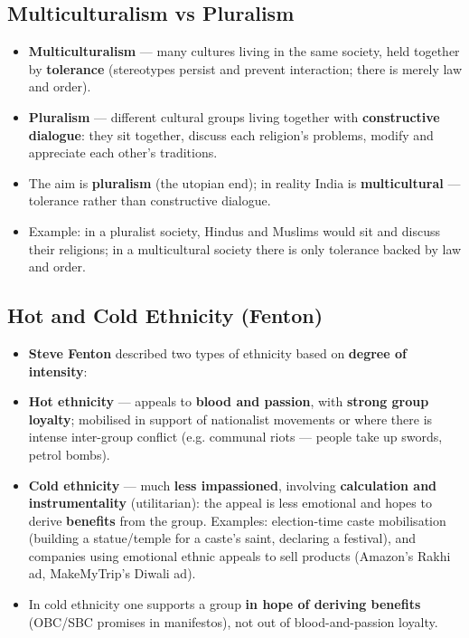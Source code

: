 \subsection{Multiculturalism vs Pluralism}

\begin{ComparisonBox}
\begin{itemize}
\item \textbf{Multiculturalism} --- many cultures living in the same society, held together by \textbf{tolerance} (stereotypes persist and prevent interaction; there is merely law and order).
\item \textbf{Pluralism} --- different cultural groups living together with \textbf{constructive dialogue}: they sit together, discuss each religion's problems, modify and appreciate each other's traditions.
\item The aim is \textbf{pluralism} (the utopian end); in reality India is \textbf{multicultural} --- tolerance rather than constructive dialogue.
\item Example: in a pluralist society, Hindus and Muslims would sit and discuss their religions; in a multicultural society there is only tolerance backed by law and order.
\end{itemize}
\end{ComparisonBox}

\subsection{Hot and Cold Ethnicity (Fenton)}

\begin{KeyConcept}
\begin{itemize}
\item \textbf{Steve Fenton} described two types of ethnicity based on \textbf{degree of intensity}:
\item \textbf{Hot ethnicity} --- appeals to \textbf{blood and passion}, with \textbf{strong group loyalty}; mobilised in support of nationalist movements or where there is intense inter-group conflict (e.g. communal riots --- people take up swords, petrol bombs).
\item \textbf{Cold ethnicity} --- much \textbf{less impassioned}, involving \textbf{calculation and instrumentality} (utilitarian): the appeal is less emotional and hopes to derive \textbf{benefits} from the group. Examples: election-time caste mobilisation (building a statue/temple for a caste's saint, declaring a festival), and companies using emotional ethnic appeals to sell products (Amazon's Rakhi ad, MakeMyTrip's Diwali ad).
\item In cold ethnicity one supports a group \textbf{in hope of deriving benefits} (OBC/SBC promises in manifestos), not out of blood-and-passion loyalty.
\end{itemize}
\end{KeyConcept}

